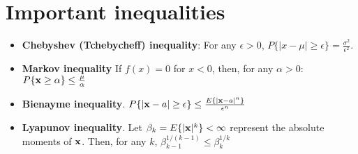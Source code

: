 \documentclass[a4paper, oneside]{book}
\begin{document}
\section{Important inequalities}
\begin{itemize}
\item \textbf{Chebyshev (Tchebycheff) inequality}: For any $\epsilon >0$, $P\{|x-\mu| \ge \epsilon\} = \frac{\sigma^2}{\epsilon^2}$.
\item \textbf{Markov inequality} If $f(x)=0$ for $x<0$, then, for any $\alpha > 0$: $P\{ \mathbf x \ge \alpha \} \le \frac{\mu}{\alpha}$
\item \textbf{Bienayme inequality}. $P\{ |\mathbf x - a| \ge \epsilon\} \le \frac{E\{ |\mathbf x - a|^n \}}{\epsilon^n}$
\item \textbf{Lyapunov inequality}. Let $\beta_k = E\{|\mathbf x|^k\} < \infty$ represent the absolute moments of $\mathbf x$. Then, for any $k$, $\beta^{1/(k-1)}_{k-1} \le \beta_k^{1/k}$
\end{itemize}
\end{document}
